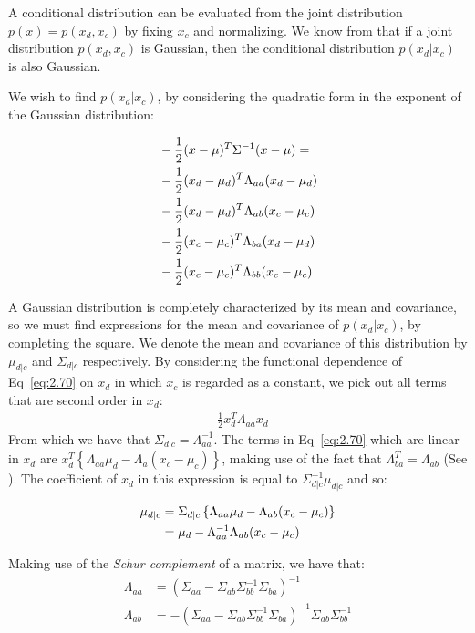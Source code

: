 A conditional distribution can be evaluated from the joint distribution $p(x) =
p(x_d, x_c)$ by fixing $x_c$ and normalizing. We know from \cite{book} that if a
joint distribution $p(x_d, x_c)$ is Gaussian, then the conditional distribution
$p(x_d|x_c)$ is also Gaussian.

We wish to find $p(x_d | x_c)$, by considering the quadratic form in the
exponent of the Gaussian distribution:

\begin{align}
	& -\frac{1}{2} (x - \mu)^T \Sigma^{-1}(x - \mu) = \label{eq:2.70}\\
	& -\frac{1}{2} (x_d - \mu_d)^T \Lambda_{aa} (x_d - \mu_d) \notag \\
	& -\frac{1}{2} (x_d - \mu_d)^T \Lambda_{ab} (x_c - \mu_c) \notag \\
	& -\frac{1}{2} (x_c - \mu_c)^T \Lambda_{ba} (x_d - \mu_d) \notag \\
	& -\frac{1}{2} (x_c - \mu_c)^T \Lambda_{bb} (x_c - \mu_c) \notag
\end{align}

A Gaussian distribution is completely characterized by its mean and covariance,
so we must find expressions for the mean and covariance of $p(x_d|x_c)$, by
completing the square. We denote the mean and covariance of this distribution by
$\mu_{d|c}$ and $\Sigma_{d|c}$ respectively. By considering the functional
dependence of Eq~\ref{eq:2.70} on $x_d$ in which $x_c$ is regarded as a
constant, we pick out all terms that are second order in $x_d$:
\begin{align}
	-\frac{1}{2} x_d^T \Lambda_{aa} x_d
\end{align}
From which we have that $\Sigma_{d|c} = \Lambda_{aa}^{-1}$. The terms in
Eq~\ref{eq:2.70} which are linear in $x_d$ are $x_d^T \left \{ \Lambda_{aa}
\mu_d - \Lambda_{a}(x_c - \mu_c) \right \}$, making use of the fact that
$\Lambda_{ba}^T = \Lambda_{ab}$ (See \cite[p.85]{book}). The coefficient of
$x_d$ in this expression is equal to $\Sigma_{d|c}^{-1} \mu_{d|c}$ and so:

\begin{align}
	\mu_{d|c} &= \Sigma_{d|c} \left\{ \Lambda_{aa} \mu_{d} - \Lambda_{ab}(x_c - \mu_c) \right\} \notag \\
		  &= \mu_d - \Lambda_{aa}^{-1} \Lambda_{ab}(x_c - \mu_c) \label{eq:2.75}
\end{align}

Making use of the \textit{Schur complement} of a matrix\cite[p.87]{book}, we
have that:
\begin{align*}
	\Lambda_{aa} &= (\Sigma_{aa} - \Sigma_{ab} \Sigma_{bb}^{-1} \Sigma_{ba})^{-1} \\
	\Lambda_{ab} &= -(\Sigma_{aa} - \Sigma_{ab} \Sigma_{bb}^{-1} \Sigma_{ba})^{-1} \Sigma_{ab} \Sigma_{bb}^{-1}
\end{align*}

